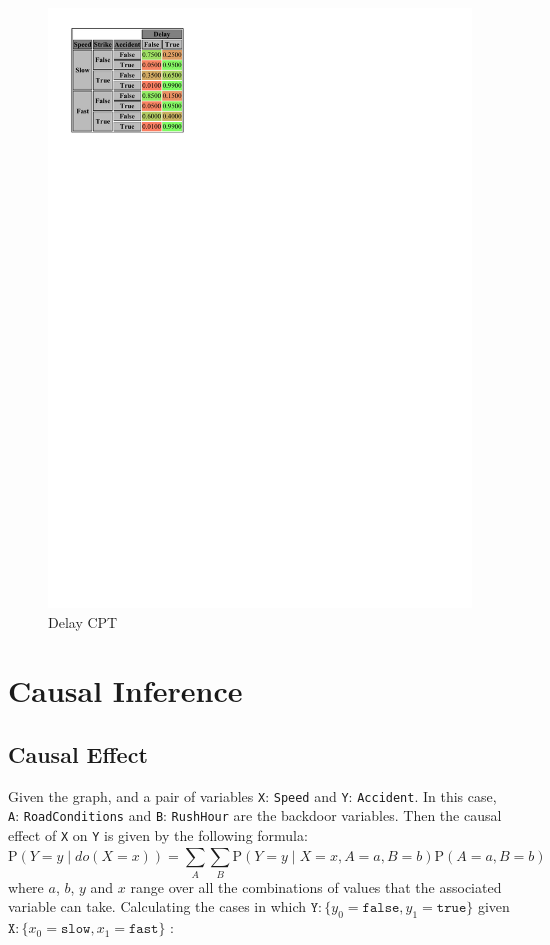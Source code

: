 \documentclass[a4paper,12pt]{article} %
\begin{document}
\begin{figure}[H]
\begin{center}
\begin{minipage}[c]{.45\textwidth}
		\includegraphics[width=.9\linewidth]{../code/delay.pdf}	
		\caption*{Delay CPT}
		\label{fig:delay}
	\end{minipage}

\end{center}
\end{figure}

\section{Causal Inference}

\subsection*{Causal Effect}
Given the graph, and a pair of variables \texttt{X}: \texttt{Speed} and \texttt{Y}: \texttt{Accident}. In this case, \texttt{A}: \texttt{RoadConditions} and \texttt{B}: \texttt{RushHour} are the backdoor variables. Then the causal effect of \texttt{X} on \texttt{Y} is given by the following formula:
\begin{equation}
	\text{P}(Y = y \mid {do}(X = x)) = \sum_{A}^{}\sum_{B}^{}	\text{P}(Y = y \mid X = x, A = a, B = b)\text{P}(A = a, B = b)
\end{equation}
where $a$, $b$, $y$ and $x$ range over all the combinations of values that the associated variable can take.
Calculating the cases in which $\mathtt{Y}: \{ y_0=\mathtt{false}, y_1=\mathtt{true}\}$ given $\mathtt{X}: \{ x_0=\mathtt{slow}, x_1=\mathtt{fast}\}$ :
\end{document}
